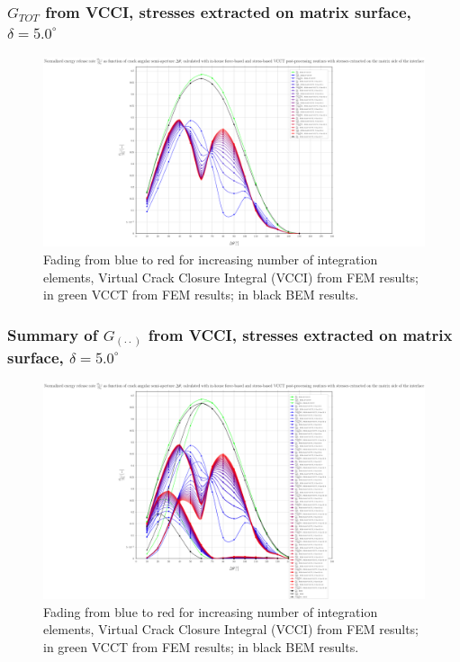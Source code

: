 \begin{frame}
\frametitle{\small $G_{TOT}$ from VCCI, stresses extracted on matrix surface, $\delta=5.0^{\circ}$}
\vspace{-0.75cm}
\centering
\captionsetup[figure]{font=scriptsize,labelfont=scriptsize}
\begin{figure}[!h]
\centering
\includegraphics[height=0.7\textheight]{2017-07-25_AbqRunSummary_SmallStrain_D05/pdf/2017-07-25_AbqRunSummary_SmallStrain_D05_F-SoM-VCCT_GTOT.pdf}
  \caption{\scriptsize Fading from blue to red for increasing number of integration elements, Virtual Crack Closure Integral (VCCI) from FEM results; in green VCCT from FEM results; in black BEM results.}
  \label{fig:res1}
\end{figure}
\end{frame}
\begin{frame}
\frametitle{\small Summary of $G_{\left(\cdot\cdot\right)}$ from VCCI, stresses extracted on matrix surface, $\delta=5.0^{\circ}$}
\vspace{-0.75cm}
\centering
\captionsetup[figure]{font=scriptsize,labelfont=scriptsize}
\begin{figure}[!h]
\centering
\includegraphics[height=0.7\textheight]{2017-07-25_AbqRunSummary_SmallStrain_D05/pdf/2017-07-25_AbqRunSummary_SmallStrain_D05_F-SoM-VCCT_Summary.pdf}
  \caption{\scriptsize Fading from blue to red for increasing number of integration elements, Virtual Crack Closure Integral (VCCI) from FEM results; in green VCCT from FEM results; in black BEM results.}
  \label{fig:res1}
\end{figure}
\end{frame}
